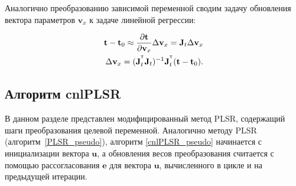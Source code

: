 \documentclass[12pt,twoside]{article}
\newcommand{\bu}{\mathbf{u}}
\newcommand{\bt}{\mathbf{t}}
\newcommand{\bv}{\mathbf{v}}
\newcommand{\be}{\mathbf{e}}
\newcommand{\bJ}{\mathbf{J}}
\begin{document}
Аналогично преобразованию зависимой переменной сводим задачу обновления вектора параметров $\bv_x$ к задаче линейной регрессии:

\begin{align*}
    \bt - \bt_0 \approx \frac {\partial \bt}{\partial \bv_x} \Delta \bv_x = \bJ_t \Delta \bv_x \\
    \Delta \bv_x  = (\bJ_t^{\T} \bJ_t)^{-1} \bJ_t^{\T} (\bt - \bt_0).
\end{align*}

\subsection{Алгоритм cnlPLSR}
В данном разделе представлен модифицированный метод PLSR, содержащий шаги преобразования целевой переменной. Аналогично методу PLSR (алгоритм~\ref{PLSR_pseudo}), алгоритм \ref{cnlPLSR_pseudo} начинается с инициализации вектора $\bu$, а обновления весов преобразования считается с помощью рассогласования $\be$ для вектора $\bu$, вычисленного в цикле и на предыдущей итерации.
\vspace{-0.5cm}
\end{document}
